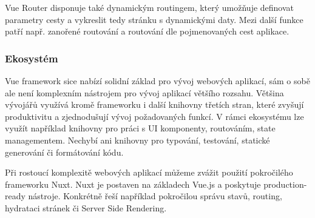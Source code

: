Vue Router disponuje také dynamickým routingem, který umožňuje definovat parametry cesty a vykreslit tedy stránku s dynamickými daty. 
Mezi další funkce patří např. zanořené routování a routování dle pojmenovaných cest aplikace.\cite{vue,vuerouter}

\subsubsection{Ekosystém}

Vue framework sice nabízí solidní základ pro vývoj webových aplikací, sám o sobě ale není komplexním nástrojem pro vývoj aplikací většího rozsahu. 
Většina vývojářů využívá kromě frameworku i další knihovny třetích stran, které zvyšují produktivitu a zjednodušují vývoj požadovaných funkcí. 
V rámci ekosystému lze využít například knihovny pro práci s UI komponenty, routováním, state managementem. 
Nechybí ani knihovny pro typování, testování, statické generování či formátování kódu.

Při rostoucí komplexitě webových aplikací můžeme zvážit použití pokročilého frameworku Nuxt. Nuxt je postaven na základech Vue.js a poskytuje production-ready nástroje. 
Konkrétně řeší například pokročilou správu stavů, routing, hydrataci stránek či Server Side Rendering.\cite{awesomevue,vue}